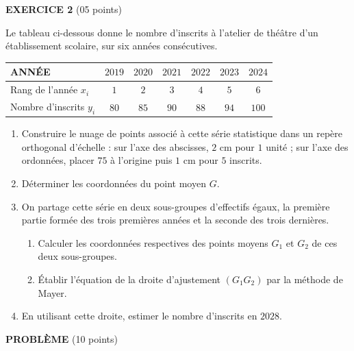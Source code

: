 \begin{devoirsurveille}
\vspace{0.7em}
\noindent\textbf{\sffamily EXERCICE 2} \hfill \textup{(05 points)}

Le tableau ci-dessous donne le nombre d'inscrits à l'atelier de théâtre d'un
établissement scolaire, sur six années consécutives.

\begin{center}\footnotesize
\renewcommand{\arraystretch}{1.25}
\begin{tabular}{|l|c|c|c|c|c|c|}
\hline
ANNÉE & $2019$ & $2020$ & $2021$ & $2022$ & $2023$ & $2024$\\
\hline
Rang de l'année $x_{i}$ & $1$ & $2$ & $3$ & $4$ & $5$ & $6$\\
\hline
Nombre d'inscrits $y_{i}$ & $80$ & $85$ & $90$ & $88$ & $94$ & $100$\\
\hline
\end{tabular}
\end{center}

\begin{enumerate}[label=\textbf{\arabic*.}, leftmargin=*, itemsep=0.25em]
  \item Construire le nuage de points associé à cette série statistique dans
        un repère orthogonal d'échelle : sur l'axe des abscisses, $2$ cm pour
        $1$ unité ; sur l'axe des ordonnées, placer $75$ à l'origine puis
        $1$ cm pour $5$ inscrits. 
  \item Déterminer les coordonnées du point moyen $G$. 
  \item On partage cette série en deux sous-groupes d'effectifs égaux, la
        première partie formée des trois premières années et la seconde des
        trois dernières.
    \begin{enumerate}[label=\textbf{\alph*)}, leftmargin=1.4em, itemsep=0.15em]
      \item Calculer les coordonnées respectives des points moyens $G_{1}$
            et $G_{2}$ de ces deux sous-groupes. 
      \item Établir l'équation de la droite d'ajustement
            $\left(G_{1}G_{2}\right)$ par la méthode de Mayer. 
    \end{enumerate}
  \item En utilisant cette droite, estimer le nombre d'inscrits en $2028$.
\end{enumerate}

\vspace{0.7em}
\noindent\textbf{\sffamily PROBLÈME} \hfill \textup{(10 points)}


\end{devoirsurveille}
